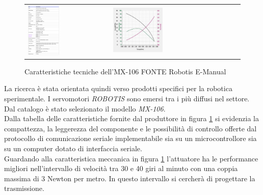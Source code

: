 \documentclass[%
corpo=11pt,
twoside,
 stile=classica,
oldstyle,
greek,%
]{toptesi}
\begin{document}
	\begin{figure}
		\centering
		\begin{tabular}{ll}
			\includegraphics[width=0.4\textwidth]{image/mx160data.png}
			&
			\includegraphics[width=0.4\textwidth]{image/mx160figure.png}
		\end{tabular}
		\caption{Caratteristiche tecniche dell'MX-106 FONTE Robotis E-Manual \cite{mx106}}
		\label{fig:MX160data}
	\end{figure}



	La ricerca è stata orientata quindi verso prodotti specifici per la robotica sperimentale. I servomotori \textit{ROBOTIS} sono emersi tra i più diffusi nel settore. Dal catalogo è stato selezionato il modello \textit{MX-106}. \\
	Dalla tabella delle caratteristiche fornite dal produttore in figura \ref{fig:MX160data} si evidenzia la compattezza, la leggerezza del componente e le possibilità di controllo offerte dal protocollo di comunicazione seriale implementabile sia su un microcontrollore sia su un computer dotato di interfaccia seriale.\\
	Guardando alla caratteristica meccanica in figura \ref{fig:MX160data} l'attuatore ha le performance migliori nell'intervallo di velocità tra 30 e 40 giri al minuto con una coppia massima di 3 Newton per metro. In questo intervallo si cercherà di progettare la trasmissione. \\
	
\end{document}
